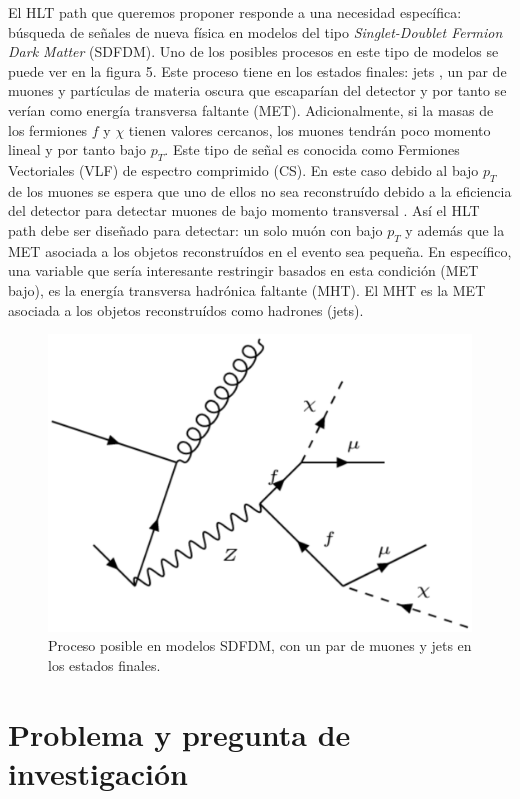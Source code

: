 El HLT path que queremos proponer responde a una necesidad específica: búsqueda de señales de nueva física en modelos del tipo \textit{Singlet-Doublet Fermion Dark Matter} (SDFDM)\cite{1475-7516-2016-03-048}. Uno de los posibles procesos en este tipo de modelos se puede ver en la figura 5. Este proceso tiene en los estados finales: jets , un par de muones y partículas de materia oscura que escaparían del detector y por tanto se verían como energía transversa faltante (MET). Adicionalmente, si la masas de los fermiones $f$ y $\chi$ tienen valores cercanos, los muones tendrán poco momento lineal y por tanto bajo $p_T$. Este tipo de señal es conocida como Fermiones Vectoriales (VLF) de espectro comprimido (CS). En este caso debido al bajo $p_T$ de los muones se espera que uno de ellos no sea reconstruído debido a la eficiencia del detector para detectar muones de bajo momento transversal \cite{Chatrchyan:2012xi}. Así el HLT path debe ser diseñado para detectar: un solo muón con bajo $p_T$ y además que la MET asociada a los objetos reconstruídos en el evento sea pequeña. En específico, una variable que sería interesante restringir basados en esta condición (MET bajo), es la energía transversa hadrónica faltante (MHT). El MHT es la MET asociada a los objetos reconstruídos como hadrones (jets).
\begin{figure}
 	\centering
 	\includegraphics[width=13cm]{F6.png}
 	\caption{\label{fig:frog} Proceso posible en modelos SDFDM, con un par de muones y jets en los estados finales.}
\end{figure}

\newpage
\section{Problema y pregunta de investigación}


